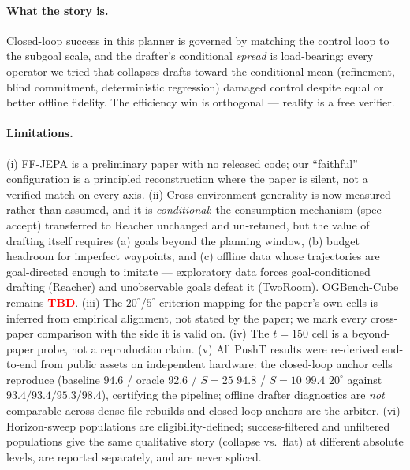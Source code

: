 \documentclass{article}
\newcommand{\degc}[1]{$#1^\circ$}
\newcommand{\TBD}{\textcolor{red}{\textbf{TBD}}}
\begin{document}
\paragraph{What the story is.} Closed-loop success in this planner is governed by matching
the control loop to the subgoal scale, and the drafter's conditional \emph{spread} is
load-bearing: every operator we tried that collapses drafts toward the conditional mean
(refinement, blind commitment, deterministic regression) damaged control despite equal or
better offline fidelity. The efficiency win is orthogonal --- reality is a free verifier.

\paragraph{Limitations.} (i) FF-JEPA is a preliminary paper with no released code; our
``faithful'' configuration is a principled reconstruction where the paper is silent, not a
verified match on every axis. (ii) Cross-environment generality is now measured rather
than assumed, and it is \emph{conditional}: the consumption mechanism (spec-accept)
transferred to Reacher unchanged and un-retuned, but the value of drafting itself
requires (a) goals beyond the planning window, (b) budget headroom for imperfect
waypoints, and (c) offline data whose trajectories are goal-directed enough to imitate
--- exploratory data forces goal-conditioned drafting (Reacher) and unobservable goals
defeat it (TwoRoom). OGBench-Cube remains \TBD. (iii) The \degc{20}/\degc{5} criterion
mapping for the paper's own cells is inferred from empirical alignment, not stated by
the paper; we mark every cross-paper comparison with the side it is valid on. (iv) The
$t{=}150$ cell is a beyond-paper probe, not a reproduction claim. (v) All PushT results
were re-derived end-to-end from public assets on independent hardware: the closed-loop
anchor cells reproduce (baseline $94.6$ / oracle $92.6$ / $S{=}25$ $94.8$ / $S{=}10$
$99.4$ \degc{20} against $93.4/93.4/95.3/98.4$), certifying the pipeline; offline
drafter diagnostics are \emph{not} comparable across dense-file rebuilds and closed-loop
anchors are the arbiter. (vi) Horizon-sweep populations are eligibility-defined;
success-filtered and unfiltered populations give the same qualitative story (collapse
vs.\ flat) at different absolute levels, are reported separately, and are never
spliced.

\end{document}
